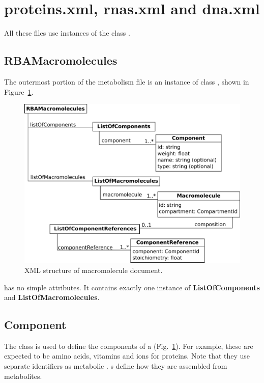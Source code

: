 
\section{proteins.xml, rnas.xml and dna.xml}

All these files use instances of the class \rbamacromolecules.


\subsection{RBAMacromolecules}
\label{sec:rba_macromolecules}

The outermost portion of the metabolism file is an instance of class
\rbamacromolecules, shown in Figure~\ref{fig:macromolecules}.

\begin{figure}
  \centering
  \includegraphics[scale=0.8]{figures/macromolecules}
  \caption{XML structure of macromolecule document.}
\label{fig:macromolecules}
\end{figure}

\rbamacromolecules{} has no simple attributes.
It contains exactly one instance of \textbf{ListOfComponents}
and \textbf{ListOfMacromolecules}.


\subsection{Component}
\label{sec:component}

The \component{} class is used to define the components of a \macromolecule{}
(Fig.~\ref{fig:macromolecules}).
For example, these are expected to be amino acids, vitamins and ions for
proteins.
Note that they use separate identifiers as metabolic \species.
\processingmap{}s define how they are assembled from metabolites.



